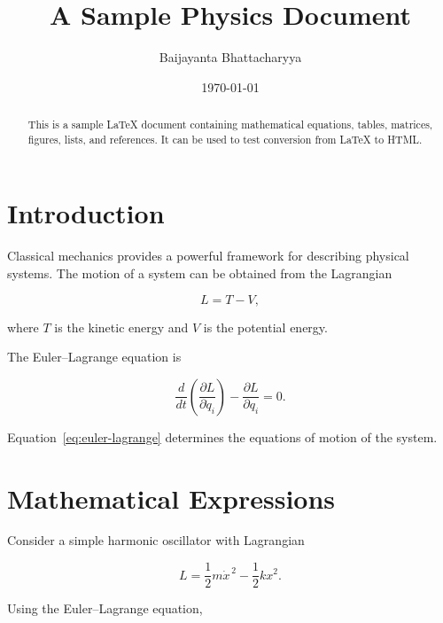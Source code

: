 \documentclass[12pt,a4paper]{article}
\title{A Sample Physics Document}
\author{Baijayanta Bhattacharyya}
\date{\today}
\begin{document}
	
	\maketitle
	
	\begin{abstract}
		This is a sample LaTeX document containing mathematical equations,
		tables, matrices, figures, lists, and references. It can be used to
		test conversion from \LaTeX{} to HTML.
	\end{abstract}
	
	\tableofcontents
	
	\section{Introduction}
	
	Classical mechanics provides a powerful framework for describing
	physical systems. The motion of a system can be obtained from the
	Lagrangian
	
	\begin{equation}
		L = T - V,
		\label{eq:lagrangian}
	\end{equation}
	
	where $T$ is the kinetic energy and $V$ is the potential energy.
	
	The Euler--Lagrange equation is
	
	\begin{equation}
		\frac{d}{dt}
		\left(
		\frac{\partial L}{\partial \dot{q}_i}
		\right)
		-
		\frac{\partial L}{\partial q_i}
		= 0.
		\label{eq:euler-lagrange}
	\end{equation}
	
	Equation~\eqref{eq:euler-lagrange} determines the equations of motion
	of the system.
	
	\section{Mathematical Expressions}
	
	Consider a simple harmonic oscillator with Lagrangian
	
	\begin{equation}
		L =
		\frac{1}{2}m\dot{x}^{\,2}
		-
		\frac{1}{2}kx^2.
	\end{equation}
	
	Using the Euler--Lagrange equation,
	
\end{document}
